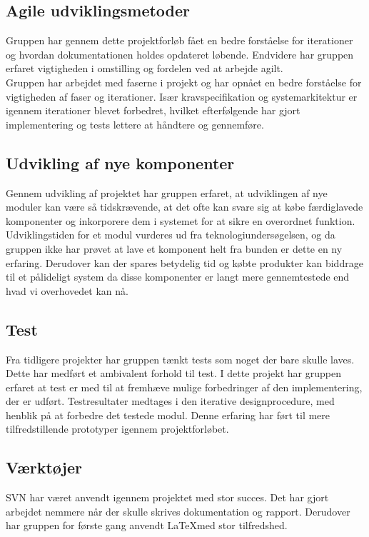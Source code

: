\subsection{Agile udviklingsmetoder}
Gruppen har gennem dette projektforløb fået en bedre forståelse for iterationer og hvordan dokumentationen holdes opdateret løbende. Endvidere har gruppen erfaret vigtigheden i omstilling og fordelen ved at arbejde agilt.\\
Gruppen har arbejdet med faserne i projekt og har opnået en bedre forståelse for vigtigheden af faser og iterationer. Især kravspecifikation og systemarkitektur er igennem iterationer blevet forbedret, hvilket efterfølgende har gjort implementering og tests lettere at håndtere og gennemføre.\\

\subsection{Udvikling af nye komponenter}
Gennem udvikling af projektet har gruppen erfaret, at udviklingen af nye moduler kan være så tidskrævende, at det ofte kan svare sig at købe færdiglavede komponenter og inkorporere dem i systemet for at sikre en overordnet funktion. Udviklingstiden for et modul vurderes ud fra teknologiundersøgelsen, og da gruppen ikke har prøvet at lave et komponent helt fra bunden er dette en ny erfaring. Derudover kan der spares betydelig tid og købte produkter kan biddrage til et pålideligt system da disse komponenter er langt mere gennemtestede end hvad vi overhovedet kan nå.

\subsection{Test}
Fra tidligere projekter har gruppen tænkt tests som noget der bare skulle laves. Dette har medført et ambivalent forhold til test. I dette projekt har gruppen erfaret at test er med til at fremhæve mulige forbedringer af den implementering, der er udført. Testresultater medtages i den iterative designprocedure, med henblik på at forbedre det testede modul. Denne erfaring har ført til mere tilfredstillende prototyper igennem projektforløbet.

\subsection{Værktøjer}
SVN har været anvendt igennem projektet med stor succes. Det har gjort arbejdet nemmere når der skulle skrives dokumentation og rapport. Derudover har gruppen for første gang anvendt \LaTeX med stor tilfredshed.



